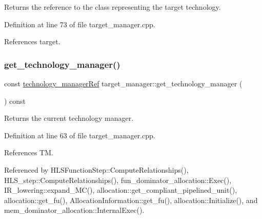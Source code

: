 Returns the reference to the class representing the target technology. 



Definition at line 73 of file target\+\_\+manager.\+cpp.



References target.

\mbox{\label{classtarget__manager_ab9bc56ace0f343c91dc10e9ca40a91e3}} 
\subsubsection{\texorpdfstring{get\+\_\+technology\+\_\+manager()}{get\_technology\_manager()}}
{\footnotesize\ttfamily const \hyperlink{technology__manager_8hpp_a4b9ecd440c804109c962654f9227244e}{technology\+\_\+manager\+Ref} target\+\_\+manager\+::get\+\_\+technology\+\_\+manager (\begin{DoxyParamCaption}{ }\end{DoxyParamCaption}) const}



Returns the current technology manager. 



Definition at line 63 of file target\+\_\+manager.\+cpp.



References TM.



Referenced by H\+L\+S\+Function\+Step\+::\+Compute\+Relationships(), H\+L\+S\+\_\+step\+::\+Compute\+Relationships(), fun\+\_\+dominator\+\_\+allocation\+::\+Exec(), I\+R\+\_\+lowering\+::expand\+\_\+\+M\+C(), allocation\+::get\+\_\+compliant\+\_\+pipelined\+\_\+unit(), allocation\+::get\+\_\+fu(), Allocation\+Information\+::get\+\_\+fu(), allocation\+::\+Initialize(), and mem\+\_\+dominator\+\_\+allocation\+::\+Internal\+Exec().

